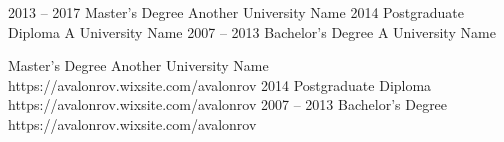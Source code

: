 \documentclass[9pt]{developercv} %
\begin{document}


\begin{entrylist}
	\entry
		{2013 -- 2017}
		{Master's Degree}
		{Another University Name}
		{\lorem\lorem\lorem}
	\entry
		{2014}
		{Postgraduate Diploma}
		{A University Name}
		{\lorem\lorem}
	\entry
		{2007 -- 2013}
		{Bachelor's Degree}
		{A University Name}
		{\lorem\lorem}
\end{entrylist}



\begin{QRentrylist}
	\QRentry
		{Master's Degree}
		{Another University Name}
		{\lorem\lorem\lorem}
		{https://avalonrov.wixsite.com/avalonrov}
	\QRentry
		{2014}
		{Postgraduate Diploma}
		{\lorem\lorem}
		{https://avalonrov.wixsite.com/avalonrov}
	\QRentry
		{2007 -- 2013}
		{Bachelor's Degree}
		{\lorem\lorem}
		{https://avalonrov.wixsite.com/avalonrov}
\end{QRentrylist}
\end{document}
